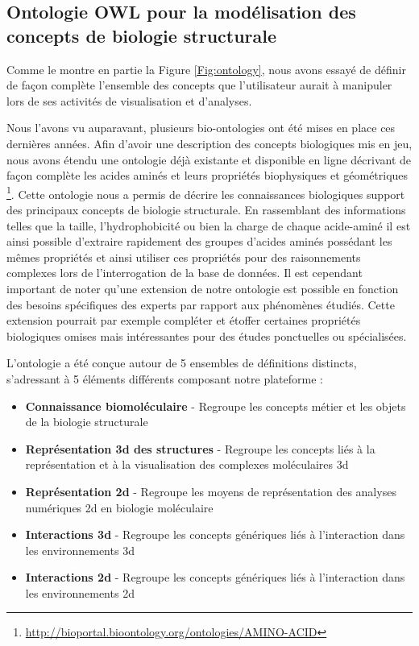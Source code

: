 
\subsection{Ontologie OWL pour la modélisation des concepts de biologie structurale} \label{owl_ontology}

Comme le montre en partie la Figure \ref{Fig:ontology}, nous avons essayé de définir de façon complète l'ensemble des concepts que l'utilisateur aurait à manipuler lors de ses activités de visualisation et d'analyses. 

Nous l'avons vu auparavant, plusieurs bio-ontologies ont été mises en place ces dernières années. Afin d'avoir une description des concepts biologiques mis en jeu, nous avons étendu une ontologie déjà existante et disponible en ligne décrivant de façon complète les acides aminés et leurs propriétés biophysiques et géométriques  \footnote{\url{http://bioportal.bioontology.org/ontologies/AMINO-ACID}}. Cette ontologie nous a permis de décrire les connaissances biologiques support des principaux concepts de biologie structurale. En rassemblant des informations telles que la taille, l'hydrophobicité ou bien la charge de chaque acide-aminé il est ainsi possible d'extraire rapidement des groupes d'acides aminés possédant les mêmes propriétés et ainsi utiliser ces propriétés pour des raisonnements complexes lors de l'interrogation de la base de données. Il est cependant important de noter qu'une extension de notre ontologie est possible en fonction des besoins spécifiques des experts par rapport aux phénomènes étudiés. Cette extension pourrait par exemple compléter et étoffer certaines propriétés biologiques omises mais intéressantes pour des études ponctuelles ou spécialisées.

L'ontologie a été conçue autour de 5 ensembles de définitions distincts, s'adressant à 5 éléments différents composant notre plateforme : 

\begin{itemize}
  \item \textbf{Connaissance biomoléculaire} - Regroupe les concepts métier et les objets de la biologie structurale 
  \item \textbf{Représentation 3d des structures} - Regroupe les concepts liés à la représentation et à la visualisation des complexes moléculaires 3d
  \item \textbf{Représentation 2d} - Regroupe les moyens de représentation des analyses numériques 2d en biologie moléculaire 
  \item \textbf{Interactions 3d} - Regroupe les concepts génériques liés à l'interaction dans les environnements 3d
  \item \textbf{Interactions 2d} - Regroupe les concepts génériques liés à l'interaction dans les environnements 2d
\end{itemize}

